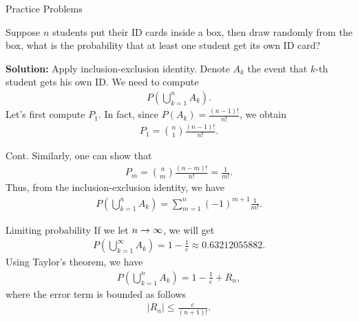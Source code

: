 \begin{frame}{Practice Problems}
	 \begin{example}
		[Coincidences] 
		\label{Coincidences exmaple}
		Suppose $n$ students put their ID cards inside a box, then draw randomly from the box, what is the probability that at least one student get its own ID card?
	\end{example}
\textbf{Solution:} Apply inclusion-exclusion identity. Denote $A_k$ the event that $k$-th student gets his own ID. We need to compute 
\begin{align*}
	P(\bigcup_{k=1}^nA_k).
\end{align*}\pause
Let's first compute $P_1$. In fact, since $P(A_k)=\frac{(n-1)!}{n!}$, we obtain
\begin{align*}
	P_1=\binom{n}{1}\frac{(n-1)!}{n!}.
\end{align*}
\end{frame}
\begin{frame}{Cont.}
Similarly, one can show that
\begin{align*}
	P_m=\binom{n}{m}\frac{(n-m)!}{n!}=\frac{1}{m!}.
\end{align*}
Thus, from the inclusion-exclusion identity, we have
\begin{align*}
	P(\bigcup_{k=1}^n A_k)=\sum_{m=1}^n(-1)^{m+1}\frac{1}{m!}.
\end{align*}

\end{frame}

\begin{frame}{Limiting probability}
	If we let $n\rightarrow \infty$, we will get
	\begin{align}
		P(\bigcup_{k=1}^\infty A_k)=1-\frac{1}{e}\approx 0.63212055882.
	\end{align}
	Using Taylor's theorem, we have
	\begin{align*}
		P(\bigcup_{k=1}^n A_k)=1-\frac{1}{e}+R_n,
	\end{align*}
	where the error term is bounded as follows
	\begin{align*}
		|R_n|\leq \frac{c}{(n+1)!}.
	\end{align*}
\end{frame}

